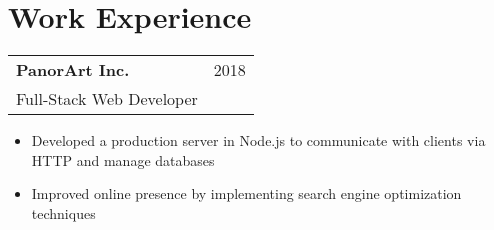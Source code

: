 \documentclass[letterpaper, 11pt]{article}
\begin{document}
\section{Work Experience}
\begin{tabular}{@{} L{12cm} @{} R{4.51cm} @{}}
  \textbf{PanorArt Inc.} & 2018 \\
  Full-Stack Web Developer\\
\end{tabular}
\begin{itemize}
\item Developed a production server in Node.js to communicate with clients
  via HTTP and manage databases
\item Improved online presence by implementing search engine optimization techniques
\end{itemize}
\end{document}
